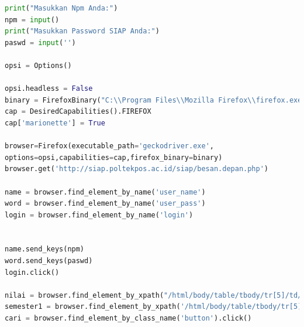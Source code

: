 \begin{enumerate}
\begin{lstlisting}[language=Python]
print("Masukkan Npm Anda:")
npm = input()
print("Masukkan Password SIAP Anda:")
paswd = input('')

opsi = Options()

opsi.headless = False
binary = FirefoxBinary("C:\\Program Files\\Mozilla Firefox\\firefox.exe")
cap = DesiredCapabilities().FIREFOX
cap['marionette'] = True

browser=Firefox(executable_path='geckodriver.exe',
options=opsi,capabilities=cap,firefox_binary=binary)
browser.get('http://siap.poltekpos.ac.id/siap/besan.depan.php')

name = browser.find_element_by_name('user_name')
word = browser.find_element_by_name('user_pass')
login = browser.find_element_by_name('login')


name.send_keys(npm)
word.send_keys(paswd)
login.click()

nilai = browser.find_element_by_xpath("/html/body/table/tbody/tr[5]/td/table[1]/tbody/tr/td[1]/table[2]/tbody/tr[1]/td[2]/a[5]").click()
semester1 = browser.find_element_by_xpath('/html/body/table/tbody/tr[5]/td/table[3]/tbody/tr[1]/td[2]/p[1]/table/tbody/tr/td[3]/select/option[4]').click()
cari = browser.find_element_by_class_name('button').click()

\end{lstlisting}


\end{enumerate}


 












